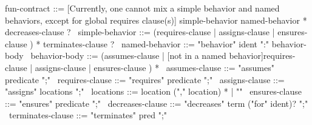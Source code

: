 \begin{syntax}
  fun-contract ::= {[Currently, one cannot mix a simple behavior and
    named behaviors, except for global requires clause(s)]
                simple-behavior named-behavior * decreases-clause ?}
  \
  simple-behavior ::= (requires-clause | assigns-clause |
  ensures-clause ) * terminates-clause ?
  \
  named-behavior ::= "behavior" ident ":" behavior-body
  \
  behavior-body ::= (assumes-clause |
                     {[not in a named behavior]requires-clause}
                    | assigns-clause |
                      ensures-clause ) *
              \
  assumes-clause ::= "assumes" predicate ";"
  \
  requires-clause ::= "requires" predicate ";"
  \
  assigns-clause ::= "assigns" locations ";"
  \
  locations ::= location ("," location) * | "\nothing"
  \
  ensures-clause ::= "ensures" predicate ";"
  \
  decreases-clause ::= "decreases" term ("for" ident)? ";"
  \
  terminates-clause ::= "terminates" pred ";"
\end{syntax}
